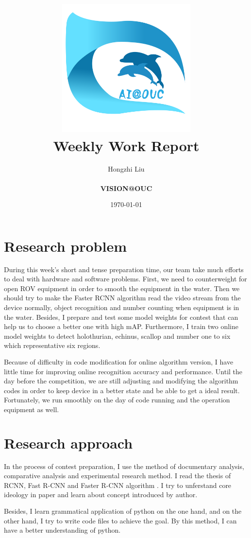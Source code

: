 \documentclass[a4paper]{article}
\title{
	\vspace*{1in}
	\includegraphics[width=2.75in]{figures/zhenglab-logo} \\
	\vspace*{1.2in}
	\textbf{\huge Weekly Work Report}
	\vspace{0.2in}
}
\author{Hongzhi Liu \\
	\vspace*{0.5in} \\
	\textbf{VISION@OUC} \\
	\vspace*{1in}
}
\date{\today}
\begin{document}
	\par
	\maketitle
	\setcounter{page}{0}
	\thispagestyle{empty}
	
	\newpage
	
	\section{Research problem}
	
	During this week's short and tense preparation time, our team take much efforts to deal with hardware and software problems. First, we need to counterweight for open ROV equipment in order to smooth the equipment in the water. Then we should try to make the Faster RCNN algorithm read the video stream from the device normally, object recognition and number counting when equipment is in the water. Besides, I prepare and test some model weights for contest that can help us to choose a better one with high mAP. Furthermore, I train two online model weights to detect holothurian, echinus, scallop and number one to six which representative six regions. 
	
	Because of difficulty in code modification for online algorithm version, I have little time for improving online recognition accuracy and performance. Until the day before the competition, we are still adjusting and modifying the algorithm codes in order to keep device in a better state and be able to get a ideal result. Fortunately, we run smoothly on the day of code running and the operation equipment as well.	
		
	\section{Research approach}
	
	In the process of contest preparation, I use the method of documentary analysis, comparative analysis and experimental research method. I read the thesis of RCNN\cite{Girshick2014}, Fast R-CNN \cite{Girshick2015Fast} and Faster R-CNN algorithm \cite{Ren2015Faster}. I try to unferstand core ideology in paper and learn about concept introduced by author.
	
	Besides, I learn grammatical application of python on the one hand, and on the other hand, I try to write code files to achieve the goal. By this method, I can have a better understanding of python.
	
\end{document}
